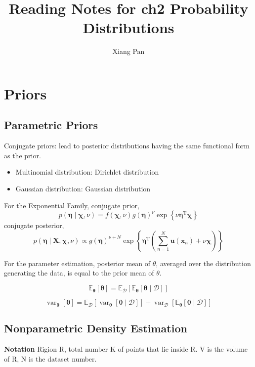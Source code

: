 \documentclass{article}
\title{Reading Notes for ch2 Probability Distributions}
\author{Xiang Pan}
\begin{document}
\maketitle
\section{Priors}
\subsection{Parametric Priors}

Conjugate priors: lead to posterior distributions having the same functional form as the prior.
\begin{itemize}
    \item Multinomial distribution: Dirichlet distribution
    \item Gaussian distribution: Gaussian distribution
\end{itemize}

For the Exponential Family, conjugate prior,
$$
p(\boldsymbol{\eta} \mid \boldsymbol{\chi}, \nu)=f(\boldsymbol{\chi}, \nu) g(\boldsymbol{\eta})^{\nu} \exp \left\{\nu \boldsymbol{\eta}^{\mathrm{T}} \boldsymbol{\chi}\right\}
$$
conjugate posterior,
$$
p(\boldsymbol{\eta} \mid \mathbf{X}, \boldsymbol{\chi}, \nu) \propto g(\boldsymbol{\eta})^{\nu+N} \exp \left\{\boldsymbol{\eta}^{\mathrm{T}}\left(\sum_{n=1}^{N} \mathbf{u}\left(\mathbf{x}_{n}\right)+\nu \boldsymbol{\chi}\right)\right\}
$$

For the parameter estimation, posterior mean of $\theta$, averaged over the distribution generating the data, is equal to the prior mean of $\theta$.

$$
\mathbb{E}_{\boldsymbol{\theta}}[\boldsymbol{\theta}]=\mathbb{E}_{\mathcal{D}}\left[\mathbb{E}_{\boldsymbol{\theta}}[\boldsymbol{\theta} \mid \mathcal{D}]\right]
$$

$$
\operatorname{var}_{\boldsymbol{\theta}}[\boldsymbol{\theta}]=\mathbb{E}_{\mathcal{D}}\left[\operatorname{var}_{\boldsymbol{\theta}}[\boldsymbol{\theta} \mid \mathcal{D}]\right]+\operatorname{var}_{\mathcal{D}}\left[\mathbb{E}_{\boldsymbol{\theta}}[\boldsymbol{\theta} \mid \mathcal{D}]\right]
$$

\subsection{Nonparametric Density Estimation}
\textbf{Notation}
Rigion R, total number K of points that lie inside R. V is the volume of R, N is the dataset number.
\end{document}
